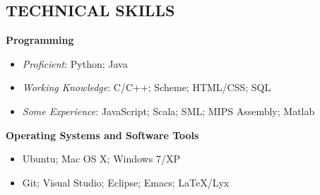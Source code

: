 \documentclass[margin]{res}
\begin{document}
\begin{resume}
\section{TECHNICAL SKILLS}
\textbf{Programming}
\begin{itemize}[leftmargin=10pt]
\item \textit{Proficient}: Python; Java
\item \textit{Working Knowledge}: C/C++; Scheme; HTML/CSS; SQL
\item \textit{Some Experience}: JavaScript; Scala; SML; MIPS Assembly; Matlab
\end{itemize}

\textbf{Operating Systems and Software Tools}
\begin{itemize}[leftmargin=10pt]
\item Ubuntu; Mac OS X; Windows 7/XP
\item Git; Visual Studio; Eclipse; Emacs; \LaTeX{}/Lyx
\end{itemize}

\end{resume}
\end{document}
